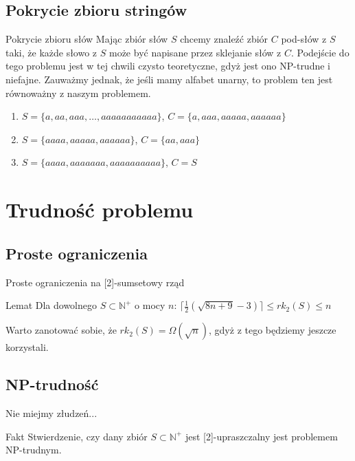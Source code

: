 \documentclass{beamer}
\newcommand{\N}{\mathbb{N}}
\begin{document}
	\subsection{Pokrycie zbioru stringów}
		\begin{frame}
			\begin{block}{Pokrycie zbioru słów}
                Mając zbiór słów $ S $ chcemy znaleźć zbiór $ C $ pod-słów z $ S $ taki, że każde słowo z $ S $ może być napisane przez sklejanie słów z $ C $.
                Podejście do tego problemu jest w tej chwili czysto teoretyczne, gdyż jest ono NP-trudne i niefajne.
                Zauważmy jednak, że jeśli mamy alfabet unarny, to problem ten jest równoważny z naszym problemem.
                \begin{enumerate}
				    \pause \item $ S = \lbrace a,aa,aaa,\dots,aaaaaaaaaaa \rbrace $, $ C = \lbrace a,aaa,aaaaa,aaaaaa \rbrace $
				    \pause \item $ S = \lbrace aaaa,aaaaa,aaaaaa \rbrace $, $ C = \lbrace aa,aaa \rbrace $
				    \pause \item $ S = \lbrace aaaa,aaaaaaa,aaaaaaaaaa \rbrace $, $ C = S $
                \end{enumerate}
			\end{block}
		\end{frame}
		
\section{Trudność problemu}
	\subsection{Proste ograniczenia}
		\begin{frame}{Proste ograniczenia na [2]-sumsetowy rząd}
            \begin{block}{Lemat}
			    Dla dowolnego $ S \subset \N^{+} $ o mocy $ n $:
                $ \lceil \frac{1}{2} ( \sqrt{8n + 9} - 3 ) \rceil \leq rk_2(S) \leq n $
            \end{block}
            
            \pause
            \vspace{\baselineskip}
            Warto zanotować sobie, że $ rk_2(S) = \Omega \left( \sqrt{n} \right) $, gdyż z tego będziemy jeszcze korzystali.
		\end{frame}
		
	\subsection{NP-trudność}
		\begin{frame}{Nie miejmy złudzeń...}
			\begin{exampleblock}{Fakt}
				Stwierdzenie, czy dany zbiór $ S \subset \N^{+} $ jest [2]-upraszczalny jest problemem NP-trudnym.
			\end{exampleblock}
				
		\end{frame}
		
\end{document}

